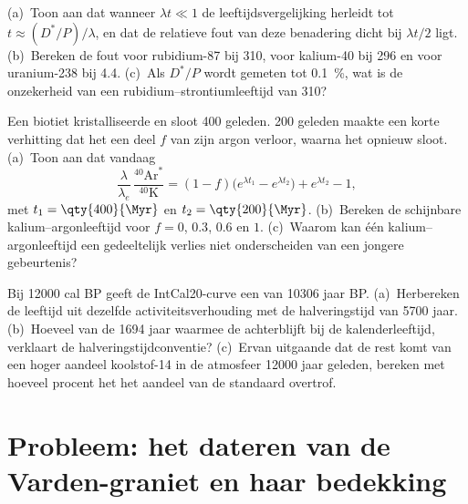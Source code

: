 \begin{exercise}[$\star\star\star$]\label{exo:b1:radiometric-methods:10}
(a)~Toon aan dat wanneer $\lambda t \ll 1$ de leeftijdsvergelijking herleidt tot $t \approx
(D^*/P)/\lambda$, en dat de relatieve fout van deze benadering dicht bij $\lambda t/2$ ligt. (b)~Bereken de fout voor rubidium-87 bij \qty{310}{\Ma}, voor kalium-40 bij \qty{296}{\Ma} en voor uranium-238 bij \qty{4.4}{\Ga}. (c)~Als $D^*/P$ wordt gemeten tot \qty{0.1}{\percent}, wat is de onzekerheid van een rubidium--strontiumleeftijd van \qty{310}{\Ma}?
\end{exercise}

\begin{exercise}[$\star\star\star$]\label{exo:b1:radiometric-methods:11}
Een biotiet kristalliseerde en sloot \qty{400}{\Myr} geleden. \qty{200}{\Myr} geleden maakte een korte verhitting dat het een deel $f$ van zijn argon verloor, waarna het opnieuw sloot. (a)~Toon aan dat vandaag
\[
  \frac{\lambda}{\lambda_e}\,\frac{^{40}\mathrm{Ar}^*}{^{40}\mathrm{K}} =
  (1 - f)\bigl(e^{\lambda t_1} - e^{\lambda t_2}\bigr) + e^{\lambda t_2} - 1,
\]
met $t_1 = \qty{400}{\Myr}$ en $t_2 = \qty{200}{\Myr}$. (b)~Bereken de schijnbare kalium--argonleeftijd voor $f = 0$, $0.3$, $0.6$ en $1$. (c)~Waarom kan één kalium--argonleeftijd een gedeeltelijk verlies niet onderscheiden van een jongere gebeurtenis?
\end{exercise}

\begin{exercise}[$\star\star\star$]\label{exo:b1:radiometric-methods:12}
Bij \num{12000} cal BP geeft de IntCal20-curve een  van \num{10306} jaar BP. (a)~Herbereken de leeftijd uit dezelfde activiteitsverhouding met de halveringstijd van \num{5700} jaar. (b)~Hoeveel van de \num{1694} jaar waarmee de  achterblijft bij de kalenderleeftijd, verklaart de halveringstijdconventie? (c)~Ervan uitgaande dat de rest komt van een hoger aandeel koolstof-14 in de atmosfeer \num{12000} jaar geleden, bereken met hoeveel procent het het aandeel van de standaard overtrof.
\end{exercise}

\section{Probleem: het dateren van de Varden-graniet en haar bedekking}

